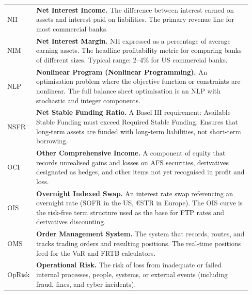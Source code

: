 \documentclass[12pt,a4paper]{article}
\begin{document}
\begin{longtable}{p{3.2cm} p{10.8cm}}
  NII   & \textbf{Net Interest Income.}
          The difference between interest earned on assets and interest paid
          on liabilities.  The primary revenue line for most commercial banks. \\[4pt]

  NIM   & \textbf{Net Interest Margin.}
          NII expressed as a percentage of average earning assets.  The
          headline profitability metric for comparing banks of different sizes.
          Typical range: 2--4\% for US commercial banks. \\[4pt]

  NLP   & \textbf{Nonlinear Program (Nonlinear Programming).}
          An optimisation problem where the objective function or constraints
          are nonlinear.  The full balance sheet optimisation is an NLP with
          stochastic and integer components. \\[4pt]

  NSFR  & \textbf{Net Stable Funding Ratio.}
          A Basel III requirement: Available Stable Funding must exceed
          Required Stable Funding.  Ensures that long-term assets are funded
          with long-term liabilities, not short-term borrowing. \\[4pt]

  OCI   & \textbf{Other Comprehensive Income.}
          A component of equity that records unrealised gains and losses on
          AFS securities, derivatives designated as hedges, and other items
          not yet recognised in profit and loss. \\[4pt]

  OIS   & \textbf{Overnight Indexed Swap.}
          An interest rate swap referencing an overnight rate (SOFR in the US,
          €STR in Europe).  The OIS curve is the risk-free term structure used
          as the base for FTP rates and derivatives discounting. \\[4pt]

  OMS   & \textbf{Order Management System.}
          The system that records, routes, and tracks trading orders and
          resulting positions.  The real-time positions feed for the VaR
          and FRTB calculators. \\[4pt]

  OpRisk & \textbf{Operational Risk.}
           The risk of loss from inadequate or failed internal processes,
           people, systems, or external events (including fraud, fines, and
           cyber incidents). \\[4pt]


\end{longtable}
\end{document}

